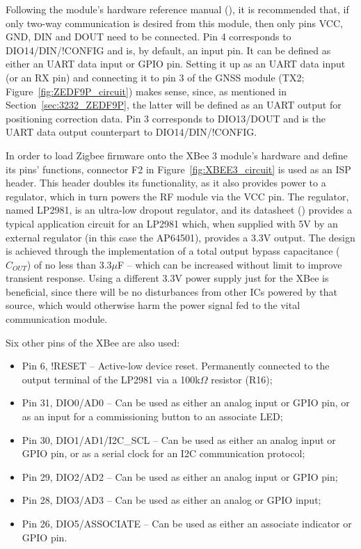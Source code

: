 Following the module's hardware reference manual (\cite{XBee}), it is recommended that, if only two-way communication is desired from this module, then only pins VCC, GND, DIN and DOUT need to be connected. Pin 4 corresponds to DIO14/DIN/!CONFIG and is, by default, an input pin. It can be defined as either an UART data input or GPIO pin. Setting it up as an UART data input (or an RX pin) and connecting it to pin 3 of the GNSS module (TX2; Figure~\ref{fig:ZEDF9P_circuit}) makes sense, since, as mentioned in Section~\ref{sec:3232_ZEDF9P}, the latter will be defined as an UART output for positioning correction data. Pin 3 corresponds to DIO13/DOUT and is the UART data output counterpart to DIO14/DIN/!CONFIG.

In order to load Zigbee firmware onto the XBee 3 module's hardware and define its pins' functions, connector F2 in Figure~\ref{fig:XBEE3_circuit} is used as an ISP header. This header doubles its functionality, as it also provides power to a regulator, which in turn powers the RF module via the VCC pin. The regulator, named LP2981, is an ultra-low dropout regulator, and its datasheet (\cite{LP2981}) provides a typical application circuit for an LP2981 which, when supplied with 5V by an external regulator (in this case the AP64501), provides a 3.3V output. The design is achieved through the implementation of a total output bypass capacitance ($C_{OUT}$) of no less than $3.3 \mu$F -- which can be increased without limit to improve transient response. Using a different 3.3V power supply just for the XBee is beneficial, since there will be no disturbances from other ICs powered by that source, which would otherwise harm the power signal fed to the vital communication module.

Six other pins of the XBee are also used:
\begin{itemize}
	\item Pin 6, !RESET -- Active-low device reset. Permanently connected to the output terminal of the LP2981 via a 100k$\Omega$ resistor (R16);
 
	\item Pin 31, DIO0/AD0 -- Can be used as either an analog input or GPIO pin, or as an input for a commissioning button to an associate LED;

	\item Pin 30, DIO1/AD1/I2C\_SCL -- Can be used as either an analog input or GPIO pin, or as a serial clock for an I2C communication protocol;

	\item Pin 29, DIO2/AD2 -- Can be used as either an analog input or GPIO pin;

	\item Pin 28, DIO3/AD3 -- Can be used as either an analog or GPIO input;

	\item Pin 26, DIO5/ASSOCIATE -- Can be used as either an associate indicator or GPIO pin.
\end{itemize}

